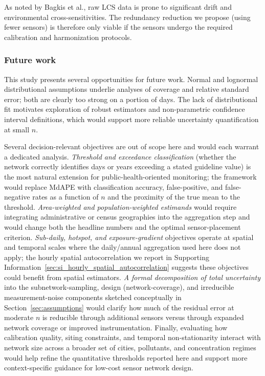 \documentclass[12pt]{article}
\theoremstyle{remark}
\begin{document}
As noted by Bagkis et al., raw LCS data is prone to significant drift and environmental cross-sensitivities.\supercite{bagkis_evolving_2025-1} The redundancy reduction we propose (using fewer sensors) is therefore only viable if the sensors undergo the required calibration and harmonization protocols.


\subsubsection{Future work}
This study presents several opportunities for future work. Normal and lognormal distributional assumptions underlie analyses of coverage and relative standard error; both are clearly too strong on a portion of days. The lack of distributional fit motivates exploration of robust estimators and non-parametric confidence interval definitions, which would support more reliable uncertainty quantification at small $n$.

Several decision-relevant objectives are out of scope here and would each warrant a dedicated analysis. \emph{Threshold and exceedance classification} (whether the network correctly identifies days or years exceeding a stated guideline value) is the most natural extension for public-health-oriented monitoring; the framework would replace MdAPE with classification accuracy, false-positive, and false-negative rates as a function of $n$ and the proximity of the true mean to the threshold. \emph{Area-weighted and population-weighted estimands} would require integrating administrative or census geographies into the aggregation step and would change both the headline numbers and the optimal sensor-placement criterion. \emph{Sub-daily, hotspot, and exposure-gradient} objectives operate at spatial and temporal scales where the daily/annual aggregation used here does not apply; the hourly spatial autocorrelation we report in Supporting Information~\ref{sec:si_hourly_spatial_autocorrelation} suggests these objectives could benefit from spatial estimators. \emph{A formal decomposition of total uncertainty} into the subnetwork-sampling, design (network-coverage), and irreducible measurement-noise components sketched conceptually in Section~\ref{sec:assumptions} would clarify how much of the residual error at moderate $n$ is reducible through additional sensors versus through expanded network coverage or improved instrumentation. Finally, evaluating how calibration quality, siting constraints, and temporal non-stationarity interact with network size across a broader set of cities, pollutants, and concentration regimes would help refine the quantitative thresholds reported here and support more context-specific guidance for low-cost sensor network design.
\end{document}
